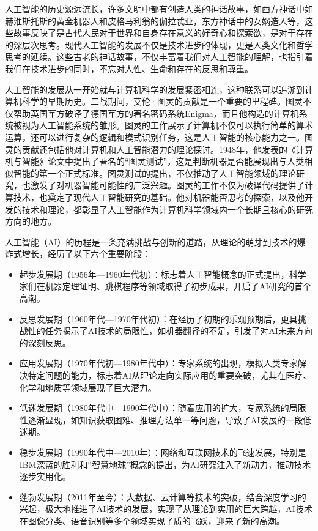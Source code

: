 人工智能的历史源远流长，许多文明中都有创造人类的神话故事，如西方神话中如赫淮斯托斯的黄金机器人和皮格马利翁的伽拉忒亚，东方神话中的女娲造人等，这些故事反映了是古代人民对于世界和自身存在意义的好奇心和探索欲，是对于存在的深层次思考。现代人工智能的发展不仅是技术进步的体现，更是人类文化和哲学思考的延续。这些古老的神话故事，不仅丰富着我们对人工智能的理解，也指引着我们在技术进步的同时，不忘对人性、生命和存在的反思和尊重。

人工智能的发展从一开始就与计算机科学的发展紧密相连，这种联系可以追溯到计算机科学的早期历史。二战期间，艾伦·图灵的贡献是一个重要的里程碑。图灵不仅帮助英国军方破译了德国军方的著名密码系统Enigma，而且他构造的计算机系统被视为人工智能系统的雏形。图灵的工作展示了计算机不仅可以执行简单的算术运算，还可以进行复杂的逻辑和模式识别任务，这是人工智能的核心能力之一。图灵的贡献还包括他对计算机和人工智能潜力的理论探讨。1948年，他发表的《计算机与智能》论文中提出了著名的“图灵测试”，这是判断机器是否能展现出与人类相似智能的第一个正式标准。图灵测试的提出，不仅推动了人工智能领域的理论研究，也激发了对机器智能可能性的广泛兴趣。图灵的工作不仅为破译代码提供了计算技术，也奠定了现代人工智能研究的基础。他对机器能否思考的探索，以及他开发的技术和理论，都彰显了人工智能作为计算机科学领域内一个长期且核心的研究方向的地方。

人工智能（AI）的历程是一条充满挑战与创新的道路，从理论的萌芽到技术的爆炸式增长，经历了以下六个重要阶段：
\begin{itemize}
    \item 起步发展期（1956年—1960年代初）：标志着人工智能概念的正式提出，科学家们在机器定理证明、跳棋程序等领域取得了初步成果，开启了AI研究的首个高潮。
    \item 反思发展期（1960年代—1970年代初）：在经历了初期的乐观预期后，更具挑战性的任务揭示了AI技术的局限性，如机器翻译的不足，引发了对AI未来方向的深刻反思。
    \item 应用发展期（1970年代初—1980年代中）：专家系统的出现，模拟人类专家解决特定问题的能力，标志着AI从理论走向实际应用的重要突破，尤其在医疗、化学和地质等领域展现了巨大潜力。
    \item 低迷发展期（1980年代中—1990年代中）：随着应用的扩大，专家系统的局限性逐渐显现，如知识获取困难、推理方法单一等问题，导致了AI发展的一段低迷期。
    \item 稳步发展期（1990年代中—2010年）：网络和互联网技术的飞速发展，特别是IBM深蓝的胜利和“智慧地球”概念的提出，为AI研究注入了新动力，推动技术逐步实用化。
    \item 蓬勃发展期（2011年至今）：大数据、云计算等技术的突破，结合深度学习的兴起，极大地推进了AI技术的发展，实现了从理论到实用的巨大跨越，AI技术在图像分类、语音识别等多个领域实现了质的飞跃，迎来了新的高潮。
\end{itemize}

